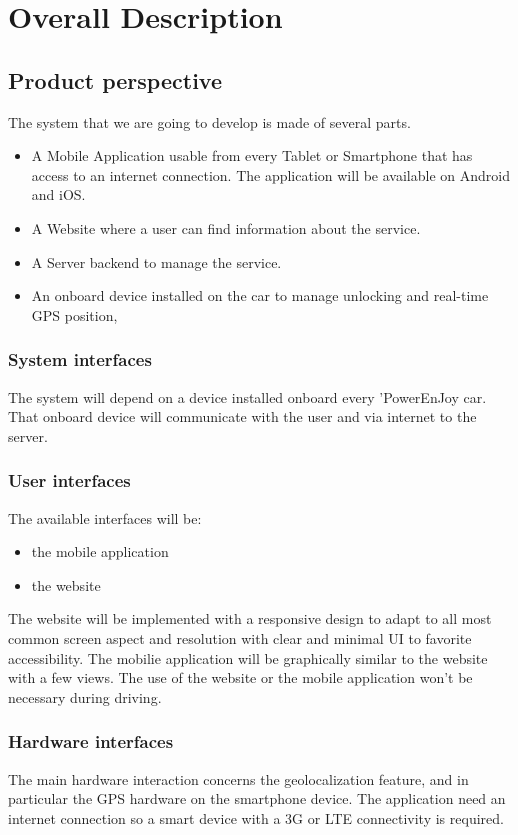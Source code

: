 \section{Overall Description}



\subsection{Product perspective}
The system that we are going to develop is made of several parts. 
\begin{itemize}
	\item A Mobile Application usable from every Tablet or Smartphone that has access to an internet connection. The application will be available on Android and iOS. 
	\item A Website where a user can find information about the service.
	\item A Server backend to manage the service.
	\item An onboard device installed on the car to manage unlocking and real-time GPS position,
\end{itemize}

\subsubsection{System interfaces}
The system will depend on a device installed onboard every 'PowerEnJoy car. That onboard device will communicate with the user and via internet to the server.

\subsubsection{User interfaces}
The available interfaces will be:
\begin{itemize}
	\item the mobile application
	\item the website
\end{itemize}
The website will be implemented with a responsive design to adapt to all most common screen aspect and resolution with clear and minimal UI to favorite accessibility.
The mobilie application will be graphically similar to the website with a few views.
The use of the website or the mobile application won't be necessary during driving. 

\subsubsection{Hardware interfaces}
The main hardware interaction concerns the geolocalization feature, and in particular the GPS hardware on the smartphone device.
The application need an internet connection so a smart device with a 3G or LTE connectivity is required.

